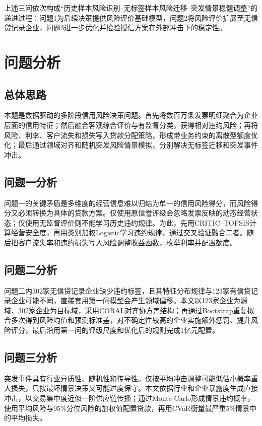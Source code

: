 \documentclass[UTF8,a4paper,12pt,fontset=fandol]{ctexart}
\numberwithin{equation}{section}
\begin{document}
上述三问依次构成“历史样本风险识别--无标签样本风险迁移--突发情景稳健调整”的递进过程：问题1为后续决策提供风险评价基础模型，问题2将风险评价扩展至无信贷记录企业，问题3进一步优化并检验授信方案在外部冲击下的稳定性。

\section{问题分析}

\subsection{总体思路}

本题是数据驱动的多阶段信用风险决策问题。首先将数百万条发票明细聚合为企业层面的信用特征；然后融合客观综合评价与有监督分类，获得相对违约风险；再将风险、利率、客户流失和损失写入贷款分配策略，形成带业务约束的离散型额度优化；最后通过领域对齐和随机突发风险情景模拟，分别解决无标签迁移和突发事件冲击。

\subsection{问题一分析}

问题一的关键矛盾是多维度的经营信息难以归结为单一的信用风险得分，而风险得分又必须转换为具体的贷款方案。仅使用原信誉评级会忽略发票反映的动态经营状态；仅使用无监督评价则不能学习历史违约规律。为此，先用CRITIC--TOPSIS计算经营安全度，再用类别加权Logistic学习违约规律，通过交叉验证融合二者。随后把客户流失率和违约损失写入风险调整收益函数，枚举利率并配置额度。

\subsection{问题二分析}

问题二内302家无信贷记录企业缺少违约标签，且其特征分布规律与123家有信贷记录企业可能不同，直接套用第一问模型会产生领域偏移。本文以123家企业为源域、302家企业为目标域，采用CORAL对齐协方差结构；再通过Bootstrap重复拟合多次得到风险均值和预测标准差，对不确定性较高的企业实施额外惩罚、提升风险评分，最后沿用第一问的评级尺度和优化后的规则完成1亿元配置。

\subsection{问题三分析}

突发事件具有行业异质性、随机性和传导性。仅按平均冲击调整可能低估小概率重大损失，只按最坏情景决策又可能过度保守。本文依据行业和企业暴露度生成直接冲击，以交易集中度近似一阶供应链传播；通过Monte Carlo形成情景违约概率，使用平均风险与95\%分位风险的加权值配置贷款，再用CVaR衡量最严重5\%情景中的平均损失。
\end{document}
